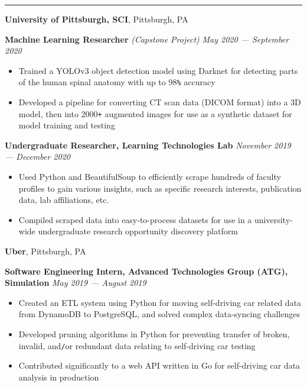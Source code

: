 \documentclass[10pt]{article}
\begin{document}
\begin{flushleft}
		\hrule

		\vspace{2.25mm}
		\textbf{University of Pittsburgh, SCI}, Pittsburgh, PA\\
		\begin{leftli}
         {\small \textbf{Machine Learning Researcher} \textit{(Capstone Project)}}  \hfill \textit{\small May 2020 --- September 2020}
			\begin{itemize}
				\item Trained a YOLOv3 object detection model using Darknet for detecting parts of the human spinal anatomy with up to 98\verb!%! accuracy
				\vspace{-2mm}
				\item Developed a pipeline for converting CT scan data (DICOM format) into a 3D model, then into 2000\texttt{+} augmented images for use as a synthetic dataset for model training and testing
			\end{itemize}
		\end{leftli}

		\begin{leftli}
			{\small \textbf{Undergraduate Researcher, Learning Technologies Lab}} \hfill \textit{\small November 2019 --- December 2020}
			\begin{itemize}
				\item Used Python and BeautifulSoup to efficiently scrape hundreds of faculty profiles to gain various insights, such as specific research interests, publication data, lab affiliations, etc.
				\vspace{-2mm}
				\item Compiled scraped data into easy-to-process datasets for use in a university-wide undergraduate research opportunity discovery platform
			\end{itemize}
		\end{leftli}

		\vspace{-1.50mm}
		\textbf{Uber}, Pittsburgh, PA\\
		\begin{leftli}
			{\small \textbf{Software Engineering Intern, Advanced Technologies Group (ATG), Simulation}} \hfill \textit{\small May 2019 --- August 2019}
			\begin{itemize}
				\item Created an ETL system using Python for moving self-driving car related data from DynamoDB to PostgreSQL, and solved complex data-syncing challenges
				\vspace{-2mm}
				\item Developed pruning algorithms in Python for preventing transfer of broken, invalid, and\texttt{/}or redundant data relating to self-driving car testing
				\vspace{-2mm}
				\item Contributed significantly to a web API written in Go for self-driving car data analysis in production
			\end{itemize}
		\end{leftli}


\end{flushleft}
\end{document}
